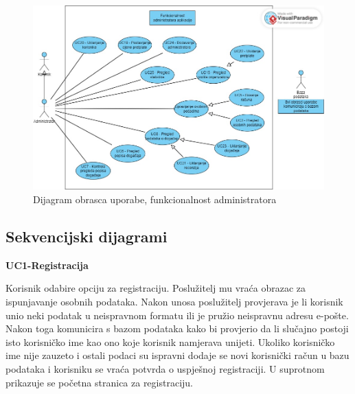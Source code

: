 					\begin{figure}[htbp]
						\centering
						\includegraphics[width=1\textwidth]{dijagrami/obrazac_funkcionalnost_administratora.jpg}
						\caption{Dijagram obrasca uporabe, funkcionalnost administratora}
					\label{fig:my_image}
					\end{figure}


				\eject
				\pagebreak
			
			\newpage
			\subsection{Sekvencijski dijagrami}
        \noindent \textbf{UC1-Registracija}
				
				
				Korisnik odabire opciju za registraciju. Poslužitelj mu vraća obrazac za ispunjavanje osobnih podataka. 
        Nakon unosa poslužitelj provjerava je li korisnik unio neki podatak u neispravnom formatu ili je pružio neispravnu adresu e-pošte. 
        Nakon toga komunicira s bazom podataka kako bi provjerio da li slučajno postoji isto korisničko ime kao ono koje korisnik namjerava unijeti. 
        Ukoliko korisničko ime nije zauzeto i ostali podaci su ispravni dodaje se novi korisnički račun u bazu podataka i korisniku se vraća potvrda o uspješnoj registraciji. 
        U suprotnom prikazuje se početna stranica za registraciju.
				
